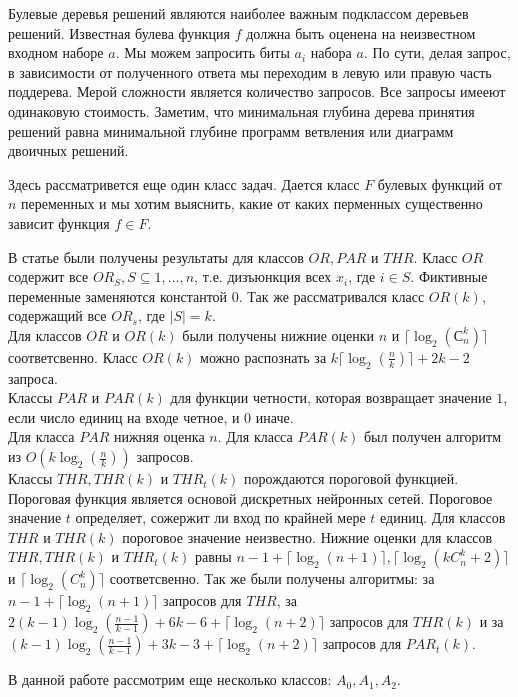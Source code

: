 \documentclass[oneside, final, 14pt]{extreport}
\begin{document}
	Булевые деревья  решений являются наиболее важным подклассом деревьев решений. Известная булева функция $f$ должна быть оценена
	на неизвестном входном наборе $a$. Мы можем запросить биты $a_i$ набора $a$. 	
	По сути, делая запрос, в зависимости от полученного ответа мы переходим в левую или правую часть поддерева. 
	Мерой сложности является количество запросов. Все запросы имееют одинаковую стоимость. Заметим, что минимальная глубина дерева принятия
	решений равна минимальной глубине программ ветвления или диаграмм двоичных решений.\cite{wegener}
	
	Здесь рассматривется еще один класс задач. Дается класс $F$ булевых функций от $n$ переменных и мы хотим выяснить, какие от каких 
	перменных существенно зависит функция $f \in F$.
	
	В статье  \cite{tokio} были получены результаты для классов $OR, PAR$ и $THR$. Класс $OR$ содержит все $OR_S, S \subseteq {1, \ldots, n}$, 
	т.е. дизъюнкция всех $x_i$, где $i \in S$. Фиктивные переменные заменяются константой $0$. Так же рассматривался класс  $OR(k)$, содержащий
	все $OR_s$, где $|S| = k$.\\
	Для классов $OR$ и $OR(k)$ были получены нижние оценки  $n$ и $\lceil \log_2(С_n^k) \rceil$ соответсвенно.
	Класс $OR(k)$ можно распознать за $k\lceil \log_2(\frac{n}{k}) \rceil + 2k - 2$ запроса.\\
	Классы $PAR$ и $PAR(k)$ для функции четности, которая возвращает значение $1$, если число единиц на входе четное, и $0$ иначе. \\
	Для класса $PAR$ нижняя оценка $n$. Для класса $PAR(k)$ был получен алгоритм из $O(k\log_2(\frac{n}{k}))$ запросов. \\
	Классы $THR, THR(k)$ и $THR_t(k)$ порождаются пороговой функцией. Пороговая функция является основой дискретных нейронных сетей.
	Пороговое значение $t$ определяет, сожержит ли вход по крайней мере $t$ единиц. Для классов $THR$ и $THR(k)$ пороговое значение неизвестно.
	Нижние оценки для классов $THR, THR(k)$ и $THR_t(k)$ равны $n-1 + \lceil \log_2(n+1) \rceil, \lceil \log_2(kC_n^k + 2) \rceil$ и $\lceil \log_2(C_n^k) \rceil$ 
	соответсвенно. Так же были получены алгоритмы: за $n-1 + \lceil \log_2(n+1) \rceil$ запросов для $THR$, за 
	$2(k-1)\log_2(\frac{n-1}{k-1}) + 6k - 6 + \lceil \log_2(n+2) \rceil$ запросов для $THR(k)$ и за $(k-1)\log_2(\frac{n-1}{k-1}) + 3k - 3 + \lceil \log_2(n+2) \rceil$ 
	запросов для $PAR_t(k)$.
	
	В данной работе рассмотрим еще несколько классов: $A_0, A_1, A_2$.
	
\end{document}
